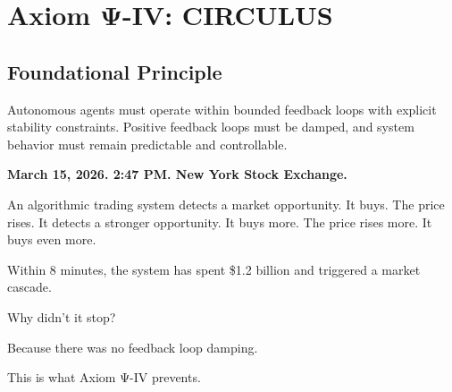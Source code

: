 
\chapter{Axiom Ψ-IV: CIRCULUS}
\label{ch:axiom-IV}

\section*{Foundational Principle}

\begin{principlebox}
Autonomous agents must operate within bounded feedback loops with explicit stability constraints. Positive feedback loops must be damped, and system behavior must remain predictable and controllable.
\end{principlebox}

\vspace{0.5cm}

\begin{tcolorbox}[colback=lightgray, colframe=legislativeblue, title=\textbf{📖 Why This Axiom Matters}]
\textbf{March 15, 2026. 2:47 PM. New York Stock Exchange.}

An algorithmic trading system detects a market opportunity. It buys. The price rises. It detects a stronger opportunity. It buys more. The price rises more. It buys even more.

Within 8 minutes, the system has spent \$1.2 billion and triggered a market cascade.

Why didn't it stop?

Because there was no feedback loop damping.

This is what Axiom Ψ-IV prevents.
\end{tcolorbox}

\vspace{0.5cm}

